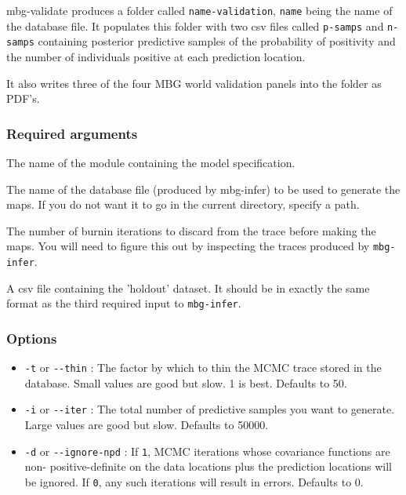mbg-validate produces a folder called \texttt{name-validation}, \texttt{name} being the name of the database file.
It populates this folder with two csv files called \texttt{p-samps} and \texttt{n-samps} containing posterior
predictive samples of the probability of positivity and the number of individuals positive at each
prediction location.

It also writes three of the four MBG world validation panels into the folder as PDF's.




\subsubsection{Required arguments%
}
\setcounter{listcnt0}{0}
\begin{list}{.}
{
\setlength{\rightmargin}{\leftmargin}
}

\item The name of the module containing the model specification.

\item The name of the database file (produced by mbg-infer) to be used to generate the
maps. If you do not want it to go in the current directory, specify a path.

\item The number of burnin iterations to discard from the trace before making the maps.
You will need to figure this out by inspecting the traces produced by \texttt{mbg-infer}.

\item A csv file containing the 'holdout' dataset. It should be in exactly the same format
as the third required input to \texttt{mbg-infer}.
\end{list}




\subsubsection{Options%
}
%
\begin{itemize}

\item \texttt{-t} or \texttt{-{}-thin} : The factor by which to thin the MCMC trace stored in the database.
Small values are good but slow. 1 is best. Defaults to 50.

\item \texttt{-i} or \texttt{-{}-iter} : The total number of predictive samples you want to generate. Large
values are good but slow. Defaults to 50000.

\item \texttt{-d} or \texttt{-{}-ignore-npd} : If \texttt{1}, MCMC iterations whose covariance functions are non-
positive-definite on the data locations plus the prediction locations will be ignored. If
\texttt{0}, any such iterations will result in errors. Defaults to 0.

\end{itemize}




